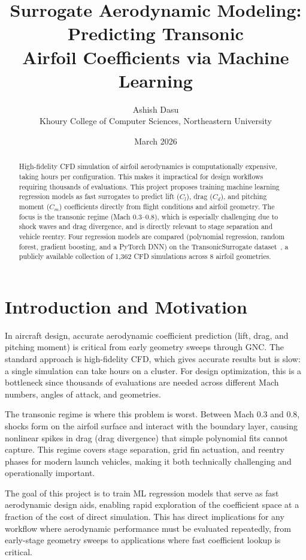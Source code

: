 \documentclass[11pt]{article}
\title{\textbf{Surrogate Aerodynamic Modeling: Predicting Transonic\\
Airfoil Coefficients via Machine Learning}}
\author{Ashish Dasu\\
\small Khoury College of Computer Sciences, Northeastern University}
\date{March 2026}
\begin{document}
\maketitle

\begin{abstract}
High-fidelity CFD simulation of airfoil aerodynamics is computationally
expensive, taking hours per configuration. This makes it impractical
for design workflows requiring thousands of evaluations. This project
proposes training machine learning regression models as fast surrogates
to predict lift ($C_l$), drag ($C_d$), and pitching moment ($C_m$)
coefficients directly from flight conditions and airfoil geometry. The
focus is the transonic regime (Mach 0.3--0.8), which is especially
challenging due to shock waves and drag divergence, and is directly
relevant to stage separation and vehicle reentry. Four regression
models are compared (polynomial regression, random forest, gradient
boosting, and a PyTorch DNN) on the TransonicSurrogate
dataset~\cite{elrefaie2024}, a publicly available collection of 1,362
CFD simulations across 8 airfoil geometries.
\end{abstract}

\section{Introduction and Motivation}

In aircraft design, accurate aerodynamic coefficient prediction
(lift, drag, and pitching moment) is critical from early geometry
sweeps through GNC. The standard approach is high-fidelity CFD, which
gives accurate results but is slow: a single simulation can take hours
on a cluster. For design optimization, this is a bottleneck since
thousands of evaluations are needed across different Mach numbers,
angles of attack, and geometries.

The transonic regime is where this problem is worst. Between Mach 0.3
and 0.8, shocks form on the airfoil surface and interact with the
boundary layer, causing nonlinear spikes in drag (drag divergence) that
simple polynomial fits cannot capture. This regime covers stage
separation, grid fin actuation, and reentry phases for modern launch
vehicles, making it both technically challenging and operationally
important.

The goal of this project is to train ML regression models that serve as
fast aerodynamic design aids, enabling rapid exploration of the
coefficient space at a fraction of the cost of direct simulation. This
has direct implications for any workflow where aerodynamic performance
must be evaluated repeatedly, from early-stage geometry sweeps to
applications where fast coefficient lookup is critical.
\end{document}
